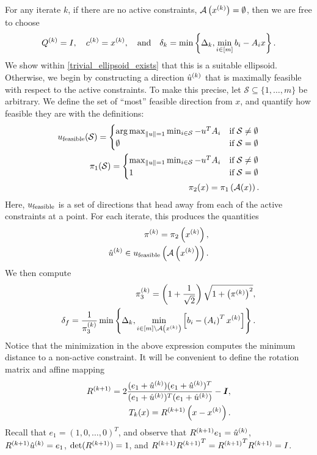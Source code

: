 For any iterate $k$, if there are no active constraints, ${\mathcal A}\left(x^{(k)}\right) = \emptyset$, then we are free to choose
\begin{align}
\label{define_linear_trivial_ellipse}
{Q^{(k)}} = I, \quad c^{(k)} = x^{(k)}, \quad \textrm{and} \quad \delta_k = \min\left\{\Delta_k, \min_{i \in [m]}{b_i - A_i x}\right\}.
\end{align}
We show within \cref{trivial_ellipsoid_exists} that this is a suitable ellipsoid.
Otherwise, we begin by constructing a direction ${{{\hat u}^{(k)}}}$ that is maximally feasible with respect to the active constraints.
To make this precise, let $\mathcal S \subseteq \{1, \ldots, m\}$ be arbitrary.
We define the set of ``most'' feasible direction from $x$, and quantify how feasible they are with the definitions:
\begin{align}
{u_{\textrm{feasible}}} (\mathcal S) = \begin{cases}
\operatorname*{arg\,max}_{\|u\| = 1} \min_{i \in \mathcal S} -u^T{{A}}_i & \text{if} \; \mathcal S \ne \emptyset \\
\emptyset & \text{if} \; \mathcal S = \emptyset
\end{cases} \label{define_alpha_one} \\
{\pi_1}(\mathcal S) = \begin{cases}
\max_{\|u\| = 1} \min_{i \in \mathcal S} -u^T{{A}}_i & \text{if} \; \mathcal S \ne \emptyset \\
1 & \text{if} \; \mathcal S = \emptyset
\end{cases} \label{define_alpha_two} \\
\pi_2(x) = {\pi_1}\left({\mathcal A}(x)\right). \label{define_alpha_three}
\end{align}
Here, ${u_{\textrm{feasible}}}$ is a set of directions that head away from each of the active constraints at a point.
For each iterate, this produces the quantities
\begin{align}
\pi^{(k)} =  \pi_2\left(x^{(k)}\right) \label{define_alpha_k}, \\
{{{\hat u}^{(k)}}} \in  {u_{\textrm{feasible}}}\left({\mathcal A}\left(x^{(k)}\right)\right). \label{define_u_k}
\end{align}
We then compute
\begin{align}
\pi_3^{(k)}=\left(1+\frac{1}{\sqrt{2}}\right)\sqrt{1+\left(\pi^{(k)}\right)^2}, \label{define_alphakp} \\
\delta_{f} = \frac 1 {\pi_3^{(k)}} \min\left\{\Delta_k, \min_{i \in [m] \setminus {\mathcal A}\left(x^{(k)}\right)} \left[{{b}}_i - \left({{A}}_i\right)^Tx^{(k)}\right]\right\}. \label{define_deltaf}
\end{align}
Notice that the minimization in the above expression computes the minimum distance to a non-active constraint.
It will be convenient to define the rotation matrix and affine mapping
\begin{align}
{R^{(k+1)}} = 2\frac{(e_1 + {{{\hat u}^{(k)}}})(e_1 +{{{\hat u}^{(k)}}})^T}{(e_1 +{{{\hat u}^{(k)}}})^T(e_1 +{{{\hat u}^{(k)}}})} - \boldsymbol I, \label{define_r} \\
T_k(x) = {R^{(k+1)}}\left(x - x^{(k)}\right). \label{define_affine_mapping}
\end{align}
Recall that $e_1 = (1, 0, \ldots, 0)^T$, and observe that ${R^{(k+1)}} e_1 = {{{\hat u}^{(k)}}}$, ${R^{(k+1)}} {{{\hat u}^{(k)}}} = e_1$, $\det({R^{(k+1)}}) = 1$, and 
${R^{(k+1)}} {R^{(k+1)}} ^T = {R^{(k+1)}} ^T{R^{(k+1)}} = I$.

